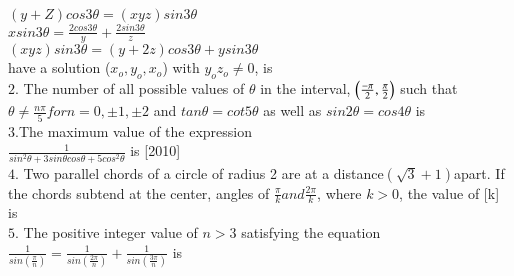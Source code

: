 \documentclass[journal,12pt,twocolumn]{IEEEtran}
\theoremstyle{remark}
\begin{document}
$(y+Z)cos3\theta=(xyz)sin3\theta$\\

$xsin3\theta=\frac{2cos3\theta}{y}+\frac{2sin3\theta}{z}$\\

$(xyz)sin3\theta=(y+2z)cos3\theta +ysin3\theta$\\

have a solution ($x_{o},y_{o},x_{o}$) with $y_{o}z_{o}\neq0$, is\hfill{}
\\

$2$. The number of all possible values of $\theta$ in the interval,
$\left(\frac{-\pi}{2},\frac{\pi}{2}\right)$  such that $\theta\neq\frac{n\pi}{5} for n=0,\pm1,\pm2 $ and $tan\theta=cot5\theta $ as well as $sin2\theta=cos4\theta$  is \hfill{}
\\

$3$.The maximum value of the expression
\\$\frac{1}{sin^2\theta+3sin\theta cos\theta+5cos^2\theta}$ is  \hfill{[2010]}
\\


$4$. Two parallel chords of a circle of radius 2 are at a distance$    \left(\sqrt{3}+1\right) $\space apart. If the chords subtend at the center, angles of $\frac{\pi}{k} and \frac{2\pi}{k}$, where $k>0$, the value of [k] is \hfill{}
\\

$5$. The positive integer value of $n>3$ satisfying the equation $\frac{1}{sin\left(\frac{\pi}{n}\right)}=\frac{1}{sin\left(\frac{2\pi}{n}\right)}+\frac{1}{sin\left(\frac{3\pi}{n}\right)}$ is\hfill{}
\end{document}
